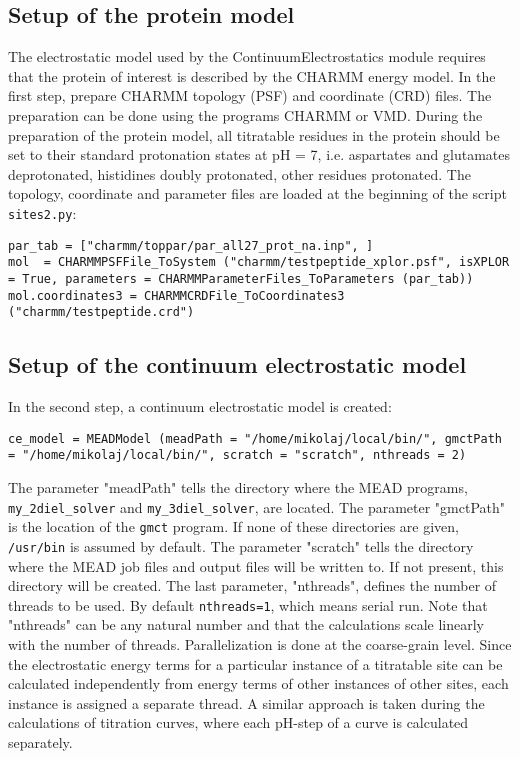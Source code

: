 \documentclass[a4paper,11pt]{article}
\newcommand{\modulename}{ContinuumElectrostatics\xspace}
\begin{document}
{%
\subsection{Setup of the protein model}
The electrostatic model used by the \modulename module requires that the protein
of interest is described by the CHARMM energy model\cite{MacKerell1998}.
%
In the first step, prepare CHARMM topology (PSF) and coordinate (CRD) files.
%
The preparation can be done using the programs CHARMM\cite{CHARMM_Brooks1983}
or VMD\cite{VMD1996}.
%
During the preparation of the protein model, all titratable residues in the protein
should be set to their standard protonation states at pH = 7, i.e. aspartates
and glutamates deprotonated, histidines doubly protonated, other residues
protonated.
%
The topology, coordinate and parameter files are loaded at the
beginning of the script \texttt{sites2.py}:

{\footnotesize \begin{lstlisting}
par_tab = ["charmm/toppar/par_all27_prot_na.inp", ]
mol  = CHARMMPSFFile_ToSystem ("charmm/testpeptide_xplor.psf", isXPLOR = True, parameters = CHARMMParameterFiles_ToParameters (par_tab))
mol.coordinates3 = CHARMMCRDFile_ToCoordinates3 ("charmm/testpeptide.crd")
\end{lstlisting} }


\subsection{Setup of the continuum electrostatic model}
In the second step, a continuum electrostatic model is created:

{\footnotesize \begin{lstlisting}
ce_model = MEADModel (meadPath = "/home/mikolaj/local/bin/", gmctPath = "/home/mikolaj/local/bin/", scratch = "scratch", nthreads = 2)
\end{lstlisting} }

\bigskip
The parameter "meadPath" tells the directory where the MEAD programs,
\texttt{my\_2diel\_solver} and \texttt{my\_3diel\_solver}, are located.
%
The parameter "gmctPath" is the location of the \texttt{gmct} program.
%
If none of these directories are given, \texttt{/usr/bin} is assumed
by default.
%
The parameter "scratch" tells the directory where the MEAD job files
and output files will be written to.
%
If not present, this directory will be created.
%
The last parameter, "nthreads", defines the number of threads to be used.
%
By default \texttt{nthreads=1}, which means serial run.
%
Note that "nthreads" can be any natural number and that the calculations
scale linearly with the number of threads.
%
Parallelization is done at the coarse-grain level.
%
Since the electrostatic energy terms for a particular instance of a titratable
site can be calculated independently from energy terms of other instances of other
sites, each instance is assigned a separate thread.
%
A similar approach is taken during the calculations of titration curves,
where each pH-step of a curve is calculated separately.


}
\end{document}
